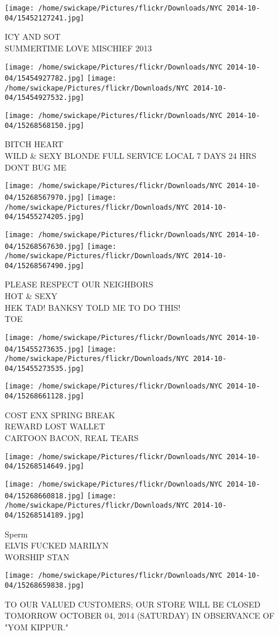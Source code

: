 \documentclass[10pt,letterpaper]{article}
\begin{document}
\vspace{0.25in}
\texttt{[image: /home/swickape/Pictures/flickr/Downloads/NYC 2014-10-04/15452127241.jpg]}

ICY AND SOT\\
SUMMERTIME LOVE MISCHIEF 2013
\pagebreak

\texttt{[image: /home/swickape/Pictures/flickr/Downloads/NYC 2014-10-04/15454927782.jpg]}
\texttt{[image: /home/swickape/Pictures/flickr/Downloads/NYC 2014-10-04/15454927532.jpg]}

\vspace{0.25in}
\texttt{[image: /home/swickape/Pictures/flickr/Downloads/NYC 2014-10-04/15268568150.jpg]}

BITCH HEART\\
WILD \& SEXY BLONDE FULL SERVICE LOCAL 7 DAYS 24 HRS\\
DONT BUG ME
\pagebreak

\texttt{[image: /home/swickape/Pictures/flickr/Downloads/NYC 2014-10-04/15268567970.jpg]}
\texttt{[image: /home/swickape/Pictures/flickr/Downloads/NYC 2014-10-04/15455274205.jpg]}

\texttt{[image: /home/swickape/Pictures/flickr/Downloads/NYC 2014-10-04/15268567630.jpg]}
\texttt{[image: /home/swickape/Pictures/flickr/Downloads/NYC 2014-10-04/15268567490.jpg]}

PLEASE RESPECT OUR NEIGHBORS\\
HOT \& SEXY\\
HEK TAD! BANKSY TOLD ME TO DO THIS!\\
TOE
\pagebreak

\texttt{[image: /home/swickape/Pictures/flickr/Downloads/NYC 2014-10-04/15455273635.jpg]}
\texttt{[image: /home/swickape/Pictures/flickr/Downloads/NYC 2014-10-04/15455273535.jpg]}

\vspace{0.25in}
\texttt{[image: /home/swickape/Pictures/flickr/Downloads/NYC 2014-10-04/15268661128.jpg]}

COST ENX SPRING BREAK\\
REWARD LOST WALLET\\
CARTOON BACON, REAL TEARS
\pagebreak

\texttt{[image: /home/swickape/Pictures/flickr/Downloads/NYC 2014-10-04/15268514649.jpg]}

\vspace{0.25in}
\texttt{[image: /home/swickape/Pictures/flickr/Downloads/NYC 2014-10-04/15268660818.jpg]}
\texttt{[image: /home/swickape/Pictures/flickr/Downloads/NYC 2014-10-04/15268514189.jpg]}

Sperm\\
ELVIS FUCKED MARILYN\\
WORSHIP STAN
\pagebreak

\texttt{[image: /home/swickape/Pictures/flickr/Downloads/NYC 2014-10-04/15268659838.jpg]}

TO OUR VALUED CUSTOMERS; OUR STORE WILL BE CLOSED TOMORROW OCTOBER 04, 2014 (SATURDAY) IN OBSERVANCE OF "YOM KIPPUR."
\pagebreak
\end{document}
